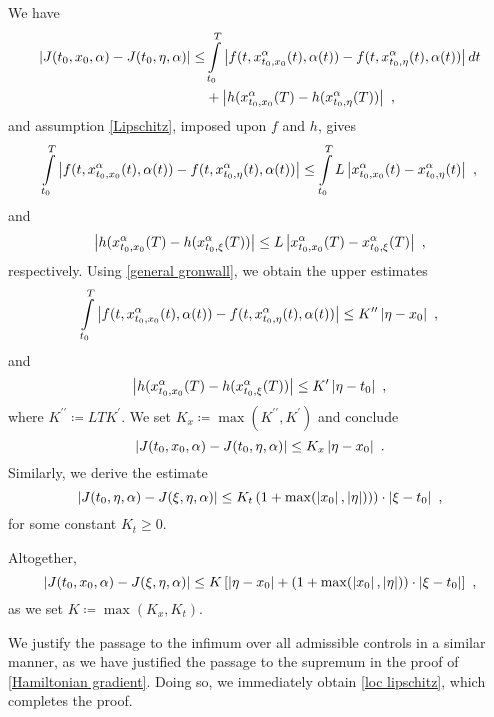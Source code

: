 We have
\begin{align*}
	\left\lvert {J(t_0, x_0, \alpha) - J(t_0, \eta, \alpha)} \right\rvert \leq &\int\limits_{t_0}^{T} \left\lvert {f(t, x_{t_0, x_0}^{\alpha}(t), \alpha(t)) - f(t, x_{t_0, \eta}^{\alpha}(t), \alpha(t))} \right\rvert dt \\
	&+ \left\lvert {h(x_{t_0, x_0}^{\alpha}(T) - h(x_{t_0, \eta}^{\alpha}(T))} \right\rvert
	\ ,
\end{align*}
and assumption \eqref{Lipschitz}, imposed upon $ f $ and $ h $, gives
\begin{equation*}
	 \int\limits_{t_0}^{T} \normof{f(t, \trajectory{t_0}{x_0}(t), \alpha(t)) - f(t, \trajectory{t_0}{\eta}(t), \alpha(t))} \leq \int\limits_{t_0}^{T} L \normof{\trajectory{t_0}{x_0}(t) - \trajectory{t_0}{\eta}(t)}\ ,
\end{equation*}
and
\begin{equation*}
	\left\lvert {h(x_{t_0, x_0}^{\alpha}(T) - h(x_{t_0, \xi}^{\alpha}(T))} \right\rvert \leq L \left\lvert {x_{t_0, x_0}^{\alpha}(T) - x_{t_0, \xi}^{\alpha}(T)} \right\rvert \ ,
\end{equation*}
respectively.
Using \eqref{general gronwall}, we obtain the upper estimates
\begin{equation*}
	\int\limits_{t_0}^{T} \left\lvert {f(t, x_{t_0, x_0}^{\alpha}(t), \alpha(t)) - f(t, x_{t_0, \eta}^{\alpha}(t), \alpha(t))} \right\rvert \leq K^{\prime\prime} \left\lvert {\eta - x_0} \right\rvert \ ,
\end{equation*}
and 
\begin{equation*}
	\normof{h(\trajectory{t_0}{x_0}(T) - h(\trajectory{t_0}{\xi}(T))} \leq K^{\prime} \normof{\eta - t_0} \ ,
\end{equation*}
where $ K^{\prime\prime} \coloneqq LTK^{\prime} $. We set $ K_x \coloneqq \max(K^{\prime\prime}, K^{\prime}) $ and conclude
\begin{equation*}
	\left\lvert {J(t_0, x_0, \alpha) - J(t_0, \eta, \alpha)} \right\rvert \leq K_{x} \left\lvert {\eta - x_0} \right\rvert \ .
\end{equation*}
Similarly, we derive the estimate
\begin{equation*}
	\left\lvert {J(t_0, \eta, \alpha) - J(\xi, \eta, \alpha)} \right\rvert \leq K_t \left(1 + \max(\left\lvert {x_0} \right\rvert, \left\lvert {\eta} \right\rvert)) \right) \cdot \left\lvert {\xi - t_0} \right\rvert \ ,
\end{equation*}
for some constant $ K_t \geq 0 $.

Altogether,
\begin{equation*}
	\normof{J(t_0, x_0, \alpha) - J(\xi, \eta, \alpha)} \leq K \left[\normof{\eta - x_0} + (1 + \max(\normof{x_0}, \normof{\eta})) \cdot \normof{\xi - t_0} \right] \ ,
\end{equation*}
as we set $ K \coloneqq \max(K_x, K_t) $.

We justify the passage to the infimum over all admissible controls in a similar manner, as we have justified the passage to the supremum in the proof of \ref{Hamiltonian gradient}. Doing so, we immediately obtain \eqref{loc lipschitz}, which completes the proof.
